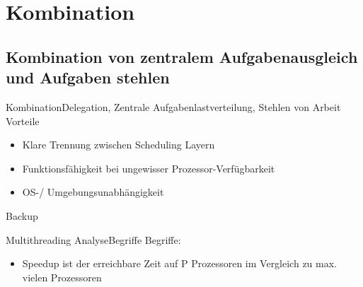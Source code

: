 \documentclass{beamer}
\begin{document}
\section{Kombination}
\subsection{Kombination von zentralem Aufgabenausgleich und Aufgaben stehlen}


\begin{frame}{Kombination}{Delegation, Zentrale Aufgabenlastverteilung, Stehlen von Arbeit}
        Vorteile
        \begin{itemize}
        \item Klare Trennung zwischen Scheduling Layern
        \item Funktionsf\"ahigkeit bei ungewisser Prozessor-Verf\"ugbarkeit
        \item OS-/ Umgebungsunabh\"angigkeit
        \end{itemize}
    
\end{frame}











%
%
%
\begin{frame}
Backup
\end{frame}



\begin{frame}{Multithreading Analyse}{Begriffe}
Begriffe:
\begin{itemize}
\item Speedup ist der erreichbare Zeit auf P Prozessoren im Vergleich zu max. vielen Prozessoren
\end{itemize}
\end{frame}
\end{document}
